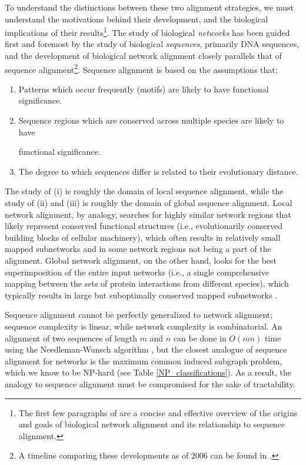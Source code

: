 \documentclass[12pt]{thesis}
\theoremstyle{plain}
\theoremstyle{definition}
\theoremstyle{remark}
\begin{document}
To understand the distinctions between these two alignment strategies, we must understand the motivations behind their development, and the biological implications of their results\footnote{The first few paragraphs of \cite{flannick2006graemlin} are a concise and effective overview of the origins and goals of biological network alignment and its relationship to sequence alignment.}. The study of biological \textit{networks} has been guided first and foremost by the study of biological \textit{sequences}, primarily DNA sequences, and the development of biological network alignment closely parallels that of sequence alignment\footnote{A timeline comparing these developments as of 2006 can be found in \cite{Sharan_2006}.}. 
\newpage
{\flushleft Sequence alignment is based on the assumptions that:}

\begin{enumerate}
\item Patterns which occur frequently (motifs) are likely to have functional significance. 
\item Sequence regions which are conserved across multiple species are likely to have

 functional significance.
\item The degree to which sequences differ is related to their evolutionary distance.
\end{enumerate}

The study of (i) is roughly the domain of local sequence alignment, while the study of (ii) and (iii) is roughly the domain of global sequence alignment. Local network alignment, by analogy, searches for highly similar network regions that likely represent conserved functional structures (i.e., evolutionarily conserved building blocks of cellular machinery), which often results in relatively small mapped subnetworks and in some network regions not being a part of the alignment. Global network alignment, on the other hand, looks for the best superimposition of the entire input networks  (i.e., a single comprehensive mapping between the sets of protein interactions from different species), which typically results in large but suboptimally conserved mapped subnetworks \cite{guzzi2017survey}.

Sequence alignment cannot be perfectly generalized to network alignment; sequence complexity is linear, while network complexity is combinatorial. An alignment of two sequences of length $m$ and $n$ can be done in $O(mn)$ time using the Needleman-Wunsch algorithm \cite{Wunsch_time_is_over}, but the closest analogue of sequence alignment for networks is the maximum common induced subgraph problem, which we know to be NP-hard (see Table \ref{NP_classifications}). As a result, the analogy to sequence alignment must be compromised for the sake of tractability.
\end{document}
